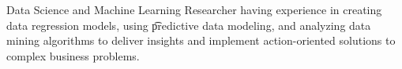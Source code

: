 %
%
%
\renewcommand{\baselinestretch}{1.1}
\setmainfont{Times New Roman}
\large{
\par{Data Science and Machine Learning Researcher having experience in creating data regression models, using \t predictive data modeling, and analyzing
data mining algorithms to deliver insights and implement action-oriented solutions to complex business problems.
}}
\\